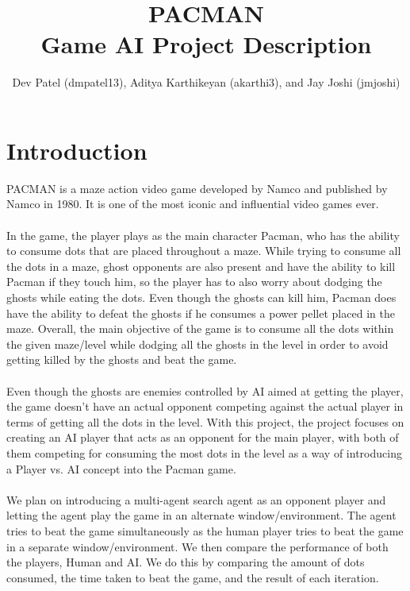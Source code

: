 \documentclass[letterpaper]{article} %
\title{PACMAN \\ Game AI Project Description}
\author{
    Dev Patel (dmpatel13), Aditya Karthikeyan (akarthi3), and Jay Joshi (jmjoshi)
}
\begin{document}
\maketitle

\begin{abstract}

\end{abstract}

\section{Introduction}
PACMAN is a maze action video game developed by Namco and published by Namco in 1980. It is one of the most iconic and influential video games ever. \\ \\
In the game, the player plays as the main character Pacman, who has the ability to consume dots that are placed throughout a maze. While trying to consume all the dots in a maze, ghost opponents are also present and have the ability to kill Pacman if they touch him, so the player has to also worry about dodging the ghosts while eating the dots. Even though the ghosts can kill him, Pacman does have the ability to defeat the ghosts if he consumes a power pellet placed in the maze. Overall, the main objective of the game is to consume all the dots within the given maze/level while dodging all the ghosts in the level in order to avoid getting killed by the ghosts and beat the game.
\\ \\
Even though the ghosts are enemies controlled by AI aimed at getting the player, the game doesn’t have an actual opponent competing against the actual player in terms of getting all the dots in the level. With this project, the project focuses on creating an AI player that acts as an opponent for the main player, with both of them competing for consuming the most dots in the level as a way of introducing a Player vs. AI concept into the Pacman game. \\ \\
We plan on introducing a multi-agent search agent as an opponent player and letting the agent play the game in an alternate window/environment. The agent tries to beat the game simultaneously as the human player tries to beat the game in a separate window/environment. We then compare the performance of both the players, Human and AI. We do this by comparing the amount of dots consumed, the time taken to beat the game, and the result of each iteration. 
\end{document}
